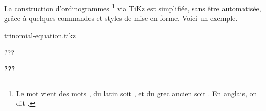 La construction d'ordinogrammes
\footnote{
	Le mot  vient des mots , du latin  soit , et du grec ancien  soit .
	En anglais, on dit .
}
via TiKz est simplifiée, sans être automatisée, grâce à quelques commandes et styles de mise en forme. Voici un exemple.

\begin{frame-gene}[Résolution dans $\mathds{R}$ de {$a x^2 + b = 0$} si $a \neq 0$]
	\begin{center}
		{trinomial-equation.tikz}
	\end{center}
\end{frame-gene}


???

\begin{frame-gene}
    \small
    \begin{verbatim}
???
	\end{verbatim}
\end{frame-gene}
